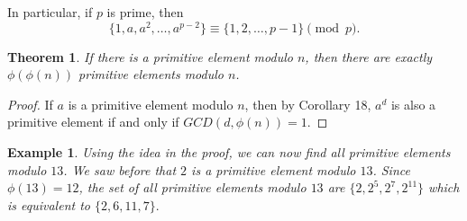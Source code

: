 \documentclass[12pt]{article}
\theoremstyle{plain}
\newtheorem{example}{Example}
\newtheorem{theorem}{Theorem}
\theoremstyle{definition}
\theoremstyle{remark}
\begin{document}
In particular, if $p$ is prime, then
$$\{1, a, a^2, \dots, a^{p-2}\} \equiv \{1,2, \dots, p-1\} \pmod{p}.$$

\bigskip
\noindent
\begin{theorem}
If there is a primitive element modulo $n$, then there are exactly $\phi(\phi(n))$ primitive elements modulo $n$.
\end{theorem}
\begin{proof}
If $a$ is a primitive element modulo $n$, then by Corollary 18, $a^d$ is also a primitive element if and only if $GCD(d, \phi(n))=1$.
\end{proof}
\begin{example}
Using the idea in the proof, we can now find all primitive elements modulo $13$. We saw before that $2$ is a primitive element modulo $13$. Since $\phi(13)=12$, the set of all primitive elements modulo $13$ are $\{2, 2^5, 2^7, 2^{11}\}$ which is equivalent to $\{2, 6, 11, 7\}. $
\end{example}
\end{document}
